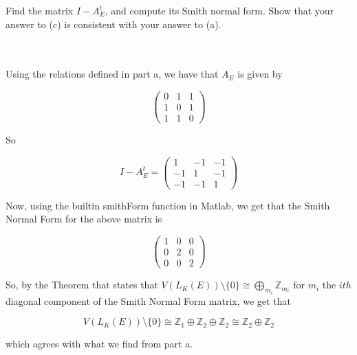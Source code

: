 Find the matrix $I-A_E^t$, and compute its Smith normal form. Show that your answer to (c) is consistent
with your answer to (a).\\\\

\begin{solution}\renewcommand{\qedsymbol}{}\ \\
    Using the relations defined in part a, we have that $A_E$ is given by

    $$\left(\begin{array}{ccc} 0 & 1 & 1 \\ 1 & 0 & 1 \\ 1 & 1 & 0 \end{array}\right)$$

    So

    $$I-A_E^t=\left(\begin{array}{ccc} 1 & -1 & -1 \\ -1 & 1 & -1 \\ -1 & -1 & 1 \end{array}\right)$$

    Now, using the builtin smithForm function in Matlab, we get that the Smith Normal Form for the above
    matrix is

    $$\left(\begin{array}{ccc} 1 & 0 & 0 \\ 0 & 2 & 0 \\ 0 & 0 & 2 \end{array}\right)$$

    So, by the Theorem that states that $V(L_K(E))\setminus\{0\}\cong\bigoplus_{m_i}\mathbb{Z}_{m_i}$
    for $m_i$ the $ith$ diagonal component of the Smith Normal Form matrix, we get that 

    $$V(L_K(E))\setminus\{0\}\cong\mathbb{Z}_1\oplus\mathbb{Z}_2\oplus\mathbb{Z}_2\cong
    \mathbb{Z}_2\oplus\mathbb{Z}_2$$

    which agrees with what we find from part a.

\end{solution}

\newpage

\newpage